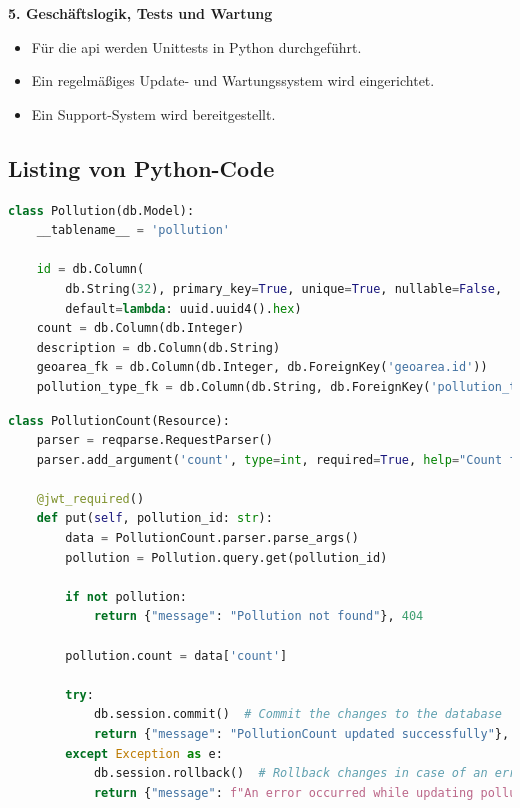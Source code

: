 \documentclass[a4paper,12pt]{article}
\begin{document}
\noindent\textbf{5. Geschäftslogik, Tests und Wartung}
\begin{itemize}
    \item Für die \gls{api} werden Unittests in Python durchgeführt.
    \item Ein regelmäßiges Update- und Wartungssystem wird eingerichtet.
    \item Ein Support-System wird bereitgestellt.
\end{itemize}

\clearpage
\subsection{Listing von Python-Code}
\label{sec:python-code}

\begin{lstlisting}[language=Python, caption=Implementation der Pollution-Klasse, label=lst:pollution]
class Pollution(db.Model):
    __tablename__ = 'pollution'

    id = db.Column(
        db.String(32), primary_key=True, unique=True, nullable=False,
        default=lambda: uuid.uuid4().hex)
    count = db.Column(db.Integer)
    description = db.Column(db.String)
    geoarea_fk = db.Column(db.Integer, db.ForeignKey('geoarea.id'))
    pollution_type_fk = db.Column(db.String, db.ForeignKey('pollution_type.id'))
\end{lstlisting}

\begin{lstlisting}[language=Python, caption=Implementation der PollutionCount-Klasse, label=lst:pollutionCount]
class PollutionCount(Resource):
    parser = reqparse.RequestParser()
    parser.add_argument('count', type=int, required=True, help="Count field is required")

    @jwt_required()
    def put(self, pollution_id: str):
        data = PollutionCount.parser.parse_args()
        pollution = Pollution.query.get(pollution_id)

        if not pollution:
            return {"message": "Pollution not found"}, 404

        pollution.count = data['count']

        try:
            db.session.commit()  # Commit the changes to the database
            return {"message": "PollutionCount updated successfully"}, 200
        except Exception as e:
            db.session.rollback()  # Rollback changes in case of an error
            return {"message": f"An error occurred while updating pollution: {str(e)}"}, 500
\end{lstlisting}
\end{document}

